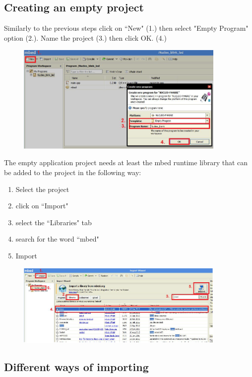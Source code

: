 \documentclass[a4paper]{article}
\begin{document}
\subsection{Creating an empty project}
Similarly to the previous steps click on ``New" (1.) then select "Empty Program" option (2.). Name the project (3.) then click OK. (4.)

\begin{figure}[H]
    \centering
    \includegraphics[width=0.9\textwidth]{figures/mbed-empty-proj.png}
\end{figure}

The empty application project needs at least the mbed runtime library that can be added to the project in the following way:
\begin{enumerate}
  \setcounter{enumi}{0}
  \item Select the project
  \item click on ``Import"
  \item select the ``Libraries" tab
  \item search for the word ``mbed"
  \item Import
\end{enumerate}

\begin{figure}[H]
    \centering
    \includegraphics[width=0.9\textwidth]{figures/mbed-import.png}
\end{figure}

\subsection{Different ways of importing}
\end{document}
